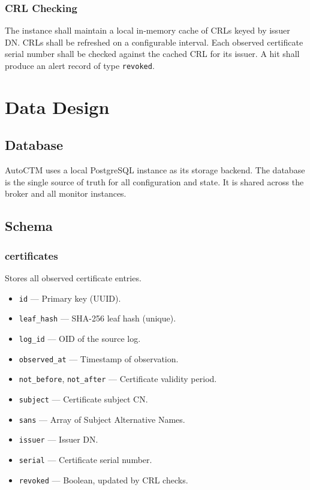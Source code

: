 \documentclass{article}
\begin{document}
\subsubsection{CRL Checking}
The instance shall maintain a local in-memory cache of CRLs keyed by issuer
DN. CRLs shall be refreshed on a configurable interval. Each observed
certificate serial number shall be checked against the cached CRL for its
issuer. A hit shall produce an alert record of type \texttt{revoked}.

\section{Data Design}
\label{sec:data}

\subsection{Database}
AutoCTM uses a local PostgreSQL instance as its storage backend. The database
is the single source of truth for all configuration and state. It is shared
across the broker and all monitor instances.

\subsection{Schema}

\subsubsection{certificates}
Stores all observed certificate entries.
\begin{itemize}
    \item \texttt{id} --- Primary key (UUID).
    \item \texttt{leaf\_hash} --- SHA-256 leaf hash (unique).
    \item \texttt{log\_id} --- OID of the source log.
    \item \texttt{observed\_at} --- Timestamp of observation.
    \item \texttt{not\_before}, \texttt{not\_after} --- Certificate validity
    period.
    \item \texttt{subject} --- Certificate subject CN.
    \item \texttt{sans} --- Array of Subject Alternative Names.
    \item \texttt{issuer} --- Issuer DN.
    \item \texttt{serial} --- Certificate serial number.
    \item \texttt{revoked} --- Boolean, updated by CRL checks.
\end{itemize}
\end{document}
